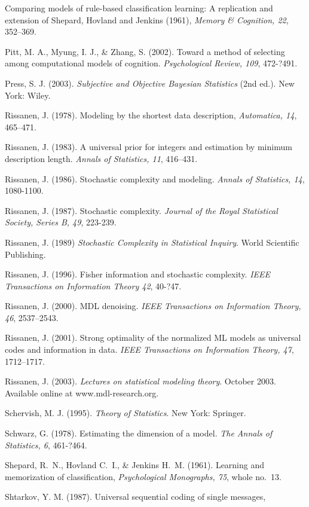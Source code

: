 \documentclass{elsart}
\begin{document}
\begin{list}{}{\setlength{\leftmargin}{12pt}\setlength{\itemindent}{-12pt}\setlength{\parsep}{0pt}}
  Comparing models of rule-based classification learning: A replication and
  extension of Shepard, Hovland and Jenkins (1961), {\em Memory \& Cognition, 22}, 352--369.
\item Pitt, M. A., Myung, I. J., \& Zhang, S. (2002). Toward a method of selecting among computational
models of cognition. {\it Psychological Review, 109}, 472-?491.
\item Press, S. J. (2003). {\it Subjective and Objective Bayesian Statistics} (2nd ed.). New York: Wiley.
\item Rissanen, J. (1978). Modeling by the shortest data description, {\it Automatica, 14}, 465--471.
\item Rissanen, J. (1983). A universal prior for integers and estimation by minimum description length.
{\it Annals of Statistics, 11}, 416--431.
\item Rissanen, J. (1986). Stochastic complexity and modeling. {\it Annals of Statistics, 14}, 1080-1100.
\item Rissanen, J. (1987). Stochastic complexity. {\it Journal of the Royal Statistical Society, Series B, 49},
223-239.
\item Rissanen, J. (1989) {\it Stochastic Complexity in Statistical Inquiry}. World Scientific Publishing.
\item Rissanen, J. (1996). Fisher information and stochastic complexity. {\it IEEE Transactions on
Information Theory 42}, 40-?47.
\item Rissanen, J. (2000). MDL denoising. {\em IEEE Transactions on Information Theory, 46}, 2537--2543.
\item Rissanen, J. (2001). Strong optimality of the normalized {ML} models as universal codes and information
in data. {\em IEEE Transactions on Information Theory, 47}, 1712--1717.
\item Rissanen, J. (2003). {\it Lectures on statistical modeling theory}. October 2003. Available
online at www.mdl-research.org.
\item Schervish, M. J. (1995). {\it Theory of Statistics}. New York: Springer.
\item Schwarz, G. (1978). Estimating the dimension of a model. {\it The Annals of Statistics, 6}, 461-?464.
\item Shepard, R.~N., Hovland C.~I., \& Jenkins H.~M. (1961). Learning and memorization of
  classification, {\em Psychological Monographs, 75}, whole no.\ 13.
\item Shtarkov, Y. M. (1987). Universal sequential coding of single messages, {\em
}
\end{list}
\end{document}
